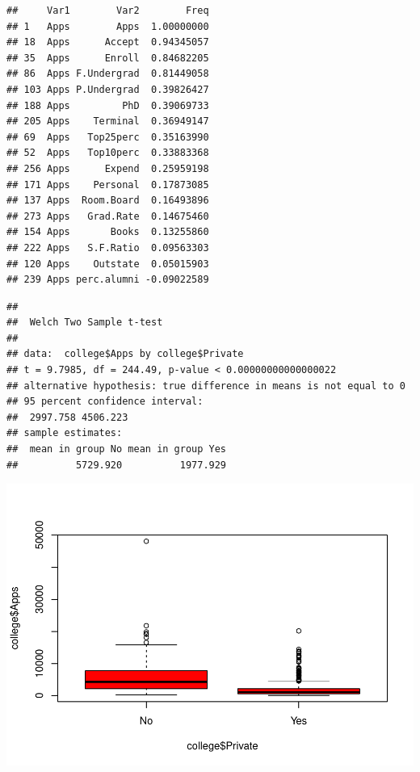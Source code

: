 \documentclass[]{article}
\newenvironment{Shaded}{\begin{snugshade}}{\end{snugshade}}
\newcommand{\AttributeTok}[1]{\textcolor[rgb]{0.77,0.63,0.00}{#1}}
\newcommand{\CommentTok}[1]{\textcolor[rgb]{0.56,0.35,0.01}{\textit{#1}}}
\newcommand{\FunctionTok}[1]{\textcolor[rgb]{0.00,0.00,0.00}{#1}}
\newcommand{\NormalTok}[1]{#1}
\newcommand{\SpecialCharTok}[1]{\textcolor[rgb]{0.00,0.00,0.00}{#1}}
\newcommand{\StringTok}[1]{\textcolor[rgb]{0.31,0.60,0.02}{#1}}
\begin{document}
\begin{verbatim}
##     Var1        Var2        Freq
## 1   Apps        Apps  1.00000000
## 18  Apps      Accept  0.94345057
## 35  Apps      Enroll  0.84682205
## 86  Apps F.Undergrad  0.81449058
## 103 Apps P.Undergrad  0.39826427
## 188 Apps         PhD  0.39069733
## 205 Apps    Terminal  0.36949147
## 69  Apps   Top25perc  0.35163990
## 52  Apps   Top10perc  0.33883368
## 256 Apps      Expend  0.25959198
## 171 Apps    Personal  0.17873085
## 137 Apps  Room.Board  0.16493896
## 273 Apps   Grad.Rate  0.14675460
## 154 Apps       Books  0.13255860
## 222 Apps   S.F.Ratio  0.09563303
## 120 Apps    Outstate  0.05015903
## 239 Apps perc.alumni -0.09022589
\end{verbatim}

\begin{Shaded}
\end{Shaded}

\begin{verbatim}
## 
##  Welch Two Sample t-test
## 
## data:  college$Apps by college$Private
## t = 9.7985, df = 244.49, p-value < 0.00000000000000022
## alternative hypothesis: true difference in means is not equal to 0
## 95 percent confidence interval:
##  2997.758 4506.223
## sample estimates:
##  mean in group No mean in group Yes 
##          5729.920          1977.929
\end{verbatim}

\begin{Shaded}
\end{Shaded}

\includegraphics{assignment3_files/figure-latex/unnamed-chunk-4-1.pdf}
\end{document}
